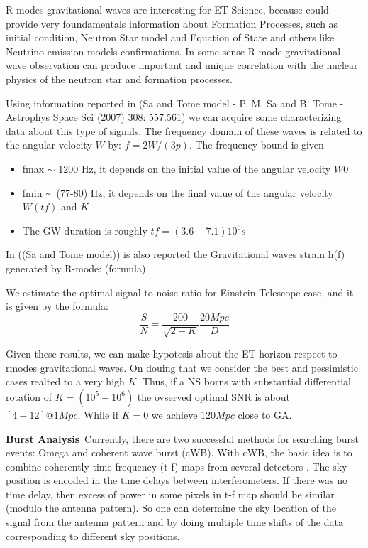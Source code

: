     R-modes gravitational waves are interesting for ET Science, because could provide very foundamentals information about Formation Processes, such as initial condition, Neutron Star model and Equation of State and others like Neutrino emission models confirmations.  In some sense R-mode gravitational wave observation can produce important and unique correlation with the nuclear physics of the neutron star and formation processes.  

Using information reported in (Sa and Tome  model - P. M. Sa and B. Tome - Astrophys Space Sci (2007) 308: 557.561) we can acquire some characterizing data about this type of signals. 
    The frequency domain of these waves is related to the angular velocity $W$ by: $f=2W/(3p)$.  The frequency bound is given
   \begin{itemize}
    \item fmax $\sim$  1200 Hz, it depends on the initial value of the angular velocity $W0$
    \item fmin $\sim$ (77-80) Hz, it depends on the final value of the angular velocity $W(tf)$ and $K$
    \item The GW duration is roughly $tf =(3.6 - 7.1)10^6 s$
   \end{itemize}
 
    In ((Sa and Tome model)) is also reported the Gravitational waves strain h(f) generated by R-mode:
    (formula)     %

    We estimate the optimal signal-to-noise ratio for Einstein Telescope case, and it is given by the formula:
    \[\frac{S}{N} = \frac{200}{\sqrt{2+K}}\frac{20Mpc}{D}\]
    
    Given these results, we can make hypotesis about the ET horizon respect to rmodes gravitational waves. On douing that we consider the best and pessimistic cases realted to a very high $K$. Thus, if a NS borns with substantial differential rotation of $K= (10^5- 10^6)$ the ovserved optimal SNR is about $[4-12] @1Mpc$. While if $K=0$ we achieve $120Mpc$ close to GA.

    
{\bf Burst Analysis}~Currently, there are two successful methods for searching burst events: Omega and coherent wave burst (cWB). 
With cWB, the basic idea is to combine coherently  time-frequency (t-f) maps from several detectors \cite{KLIMENKO2011}. The sky position is encoded in the time  delays between  interferometers. If there was no time delay, then excess of power in some pixels in t-f map should be  similar (modulo the antenna pattern). So one can determine the sky location of the  signal from the antenna pattern and by doing multiple time shifts of the data corresponding  to different sky positions. %

